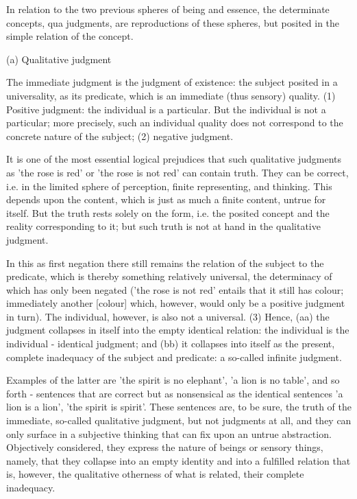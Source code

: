 In relation to the two previous spheres of being and essence,
the determinate concepts, qua judgments, are reproductions of
these spheres, but posited in the simple relation of the concept.

(a) Qualitative judgment

The immediate judgment is the judgment of existence:
the subject posited in a universality, as its predicate,
which is an immediate (thus sensory) quality.
(1) Positive judgment: the individual is a particular.
But the individual is not a particular;
more precisely, such an individual quality
does not correspond to the concrete nature of the subject;
(2) negative judgment.

It is one of the most essential logical prejudices that such qualitative
judgments as 'the rose is red' or 'the rose is not red' can contain truth.
They can be correct, i.e. in the limited sphere of perception,
finite representing, and thinking. This depends upon the content,
which is just as much a finite content, untrue for itself.
But the truth rests solely on the form, i.e. the posited concept and
the reality corresponding to it; but such truth is not at hand
in the qualitative judgment.

In this as first negation there still remains
the relation of the subject to the predicate,
which is thereby something relatively universal,
the determinacy of which has only been negated
('the rose is not red' entails that it still has colour;
immediately another [colour] which, however,
would only be a positive judgment in turn).
The individual, however, is also not a universal.
(3) Hence, (aa) the judgment collapses in itself
into the empty identical relation:
the individual is the individual - identical judgment;
and (bb) it collapses into itself as the present,
complete inadequacy of the subject and predicate:
a so-called infinite judgment.

Examples of the latter are 'the spirit is no elephant',
'a lion is no table', and so forth - sentences that are correct
but as nonsensical as the identical sentences 'a lion is a lion',
'the spirit is spirit'. These sentences are, to be sure,
the truth of the immediate, so-called qualitative judgment,
but not judgments at all, and they can only surface in
a subjective thinking that can fix upon an untrue abstraction.
Objectively considered, they express the nature of beings
or sensory things, namely, that they collapse into an
empty identity and into a fulfilled relation that is, however,
the qualitative otherness of what is related, their complete inadequacy.

